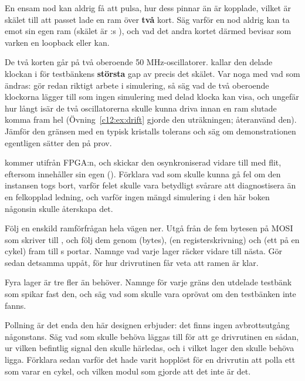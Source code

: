  En ensam nod kan aldrig få  att pulsa, hur dess pinnar än är kopplade,
vilket är skälet till att passet lade en ram över \textbf{två} kort. Säg varför en nod aldrig kan ta
emot sin egen ram (skälet är :s ), och vad det andra kortet därmed bevisar
som varken en loopback eller  kan.

 De två korten går på två oberoende 50 MHz-oscillatorer.  kallar den
delade klockan i  för testbänkens \textbf{största} gap av precis det skälet.
Var noga med vad som ändras:  gör redan riktigt arbete i simulering, så säg vad
de två oberoende klockorna lägger till som ingen simulering med delad klocka kan visa, och ungefär
hur långt isär de två oscillatorerna skulle kunna driva innan en ram slutade komma fram hel
(Övning~\ref{c12:ex:drift} gjorde den uträkningen; återanvänd den). Jämför den gränsen med en typisk
kristalls tolerans och säg om demonstrationen egentligen sätter den på prov.

  kommer utifrån FPGA:n, och  skickar den osynkroniserad
vidare till  med flit, eftersom  innehåller sin egen
 (). Förklara vad som skulle kunna gå fel om den instansen togs bort,
varför felet skulle vara betydligt svårare att diagnostisera än en felkopplad ledning, och varför
ingen mängd simulering i den här boken någonsin skulle återskapa det.

\label{c19:ex:endtoend}
 Följ en enskild ramförfrågan hela vägen ner. Utgå från de fem bytesen på MOSI som skriver
 till , och följ dem genom  (bytes),
 (en registerskrivning) och  (ett  på en cykel)
fram till s portar. Namnge vad varje lager räcker vidare till nästa. Gör sedan
detsamma uppåt, för hur drivrutinen får veta att ramen är klar.

 Fyra lager är tre fler än  behöver. Namnge för varje gräns den
utdelade testbänk som spikar fast den, och säg vad som skulle vara oprövat om den testbänken inte
fanns.

 Pollning är det enda den här designen erbjuder: det finns ingen avbrottsutgång någonstans.
Säg vad som skulle behöva läggas till för att ge drivrutinen en sådan, ur vilken befintlig signal den
skulle härledas, och i vilket lager den skulle behöva ligga. Förklara sedan varför det hade varit
hopplöst för en drivrutin att polla ett  som varar en cykel, och vilken modul som gjorde
att det inte är det.

